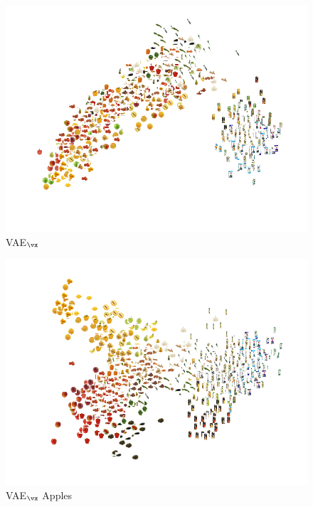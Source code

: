 
\begin{subfigure}[b]{0.3\textwidth}
	\centering
	\includegraphics[width=\textwidth]{Chapter1/pics_paperB/pca_latents_vae_seed2}
	\caption{VAE$_{\vx}$}
	\label{fig:pca_latents_vae}
\end{subfigure}
\begin{subfigure}[b]{0.3\textwidth}
	\centering
	\includegraphics[width=\textwidth]{Chapter1/pics_paperB/pca_latents_vcca_xiwy_seed2}
	\caption{VAE$_{\vx}$ Apples}
	\label{fig:pca_latents_vae_apples}
\end{subfigure}